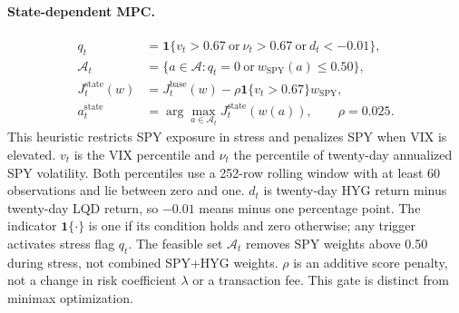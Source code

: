 \paragraph{State-dependent MPC.}
\begin{equation}
\begin{aligned}
q_t&=\mathbf1\{v_t>0.67\ \text{or}\ \nu_t>0.67\ \text{or}\ d_t<-0.01\},\\
\mathcal A_t&=\{a\in\mathcal A:q_t=0\ \text{or}\ w_{\mathrm{SPY}}(a)\le0.50\},\\
J_t^{\mathrm{state}}(w)&=J_t^{\mathrm{base}}(w)-\rho\mathbf1\{v_t>0.67\}w_{\mathrm{SPY}},\\
a_t^{\mathrm{state}}&=\arg\max_{a\in\mathcal A_t}J_t^{\mathrm{state}}(w(a)),
\qquad \rho=0.025.
\end{aligned}
\label{eq:state-robust}
\end{equation}
This heuristic restricts SPY exposure in stress and penalizes SPY when VIX is elevated.
$v_t$ is the VIX percentile and $\nu_t$ the percentile of twenty-day annualized SPY volatility. Both percentiles use a 252-row rolling window with at least 60 observations and lie between zero and one. $d_t$ is twenty-day HYG return minus twenty-day LQD return, so $-0.01$ means minus one percentage point. The indicator $\mathbf1\{\cdot\}$ is one if its condition holds and zero otherwise; any trigger activates stress flag $q_t$. The feasible set $\mathcal A_t$ removes SPY weights above 0.50 during stress, not combined SPY+HYG weights. $\rho$ is an additive score penalty, not a change in risk coefficient $\lambda$ or a transaction fee. This gate is distinct from minimax optimization.


